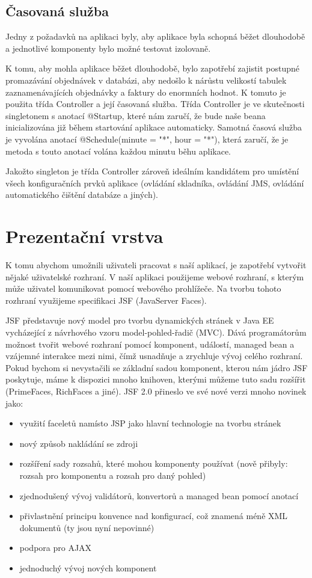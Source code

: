 \documentclass[122pt,oneside]{fithesis}
\begin{document}
\subsection{Časovaná služba}
Jedny z požadavků na aplikaci byly, aby aplikace byla schopná běžet dlouhodobě a jednotlivé komponenty bylo možné testovat izolovaně. 

K tomu, aby mohla aplikace běžet dlouhodobě, bylo zapotřebí zajistit postupné promazávání objednávek v databázi, aby nedošlo k nárůstu velikostí tabulek zaznamenávajících objednávky a faktury do enormních hodnot. K tomuto je použita třída Controller a její časovaná služba. Třída Controller je ve skutečnosti singletonem s anotací @Startup, které nám zaručí, že bude naše beana inicializována již během startování aplikace automaticky. Samotná časová služba je vyvolána anotací @Schedule(minute = "*", hour = "*"), která zaručí, že je metoda s touto anotací volána každou minutu běhu aplikace. 

Jakožto singleton je třída Controller zároveň ideálním kandidátem pro umístění všech konfiguračních prvků aplikace (ovládání skladníka, ovládání JMS, ovládání automatického čištění databáze a jiných).


\section{Prezentační vrstva}
K tomu abychom umožnili uživateli pracovat s naší aplikací, je zapotřebí vytvořit nějaké uživatelské rozhraní. V naší aplikaci použijeme webové rozhraní, s kterým může uživatel komunikovat pomocí webového prohlížeče. Na tvorbu tohoto rozhraní využijeme specifikaci JSF (JavaServer Faces). 

JSF představuje nový model pro tvorbu dynamických stránek v Java EE vycházející z návrhového vzoru model-pohled-řadič (MVC). Dává programátorům možnost tvořit webové rozhraní pomocí komponent, událostí, managed bean a vzájemné interakce mezi nimi, čímž usnadňuje a zrychluje vývoj celého rozhraní. Pokud bychom si nevystačili se základní sadou komponent, kterou nám jádro JSF poskytuje, máme k dispozici mnoho knihoven, kterými můžeme tuto sadu rozšířit (PrimeFaces, RichFaces a jiné). JSF 2.0 přineslo ve své nové verzi mnoho novinek jako:

\begin{itemize}
  \item využití faceletů namísto JSP jako hlavní technologie na tvorbu stránek
  \item nový způsob nakládání se zdroji
  \item rozšíření sady rozsahů, které mohou komponenty používat (nově přibyly: rozsah pro komponentu a rozsah pro daný pohled)
  \item zjednodušený vývoj validátorů, konvertorů a managed bean pomocí anotací
  \item přivlastnění principu konvence nad konfigurací, což znamená méně XML dokumentů (ty jsou nyní nepovinné)
  \item podpora pro AJAX
  \item jednoduchý vývoj nových komponent
\end{itemize}
\end{document}
